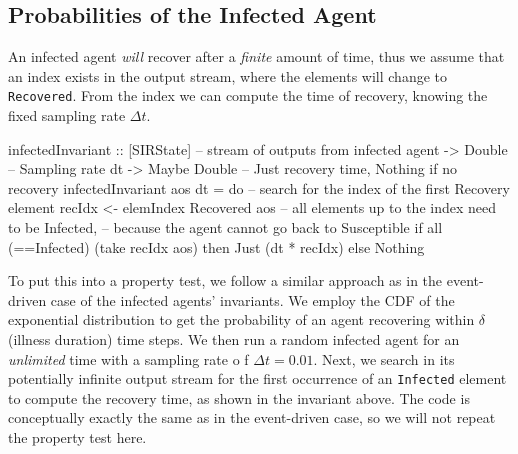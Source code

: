 \subsection{Probabilities of the Infected Agent}
An infected agent \textit{will} recover after a \textit{finite} amount of time, thus we assume that an index exists in the output stream, where the elements will change to \texttt{Recovered}. From the index we can compute the time of recovery, knowing the fixed sampling rate $\Delta t$.

\begin{HaskellCode}
infectedInvariant :: [SIRState]   -- stream of outputs from infected agent
                  -> Double       -- Sampling rate dt
                  -> Maybe Double -- Just recovery time, Nothing if no recovery
infectedInvariant aos dt  = do
  -- search for the index of the first Recovery element
  recIdx <- elemIndex Recovered aos
  -- all elements up to the index need to be Infected,
  -- because the agent cannot go back to Susceptible
  if all (==Infected) (take recIdx aos)
    then Just (dt * recIdx)
    else Nothing
\end{HaskellCode}

To put this into a property test, we follow a similar approach as in the event-driven case of the infected agents' invariants. We employ the CDF of the exponential distribution to get the probability of an agent recovering within $\delta$ (illness duration) time steps. We then run a random infected agent for an \textit{unlimited} time with a sampling rate o f $\Delta t = 0.01$. Next, we search in its potentially infinite output stream for the first occurrence of an \texttt{Infected} element to compute the recovery time, as shown in the invariant above. The code is conceptually exactly the same as in the event-driven case, so we will not repeat the property test here.

%
%
%

